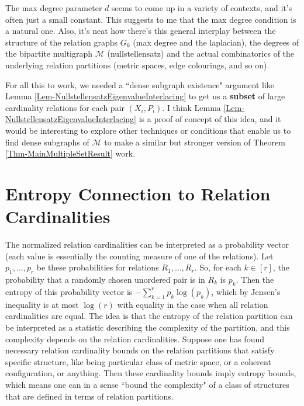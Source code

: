 \documentclass[12pt]{article}
\theoremstyle{definition}
\begin{document}
	The max degree parameter $d$ seems to come up in a variety of contexts, and it's often just a small constant.  This suggests to me that the max degree condition is a natural one.  Also, it's neat how there's this general interplay between the structure of the relation graphs $G_k$ (max degree and the laplacian), the degrees of the bipartite multigraph $\mathcal{M}$ (nullstellensatz) and the actual combinatorics of the underlying relation partitions (metric spaces, edge colourings, and so on).
	
	For all this to work, we needed a ``dense subgraph existence" argument like Lemma \ref{Lem-NullstellensatzEigenvalueInterlacing} to get us a \textbf{subset} of large cardinality relations for each pair $(X_i,P_i)$.  I think Lemma \ref{Lem-NullstellensatzEigenvalueInterlacing} is a proof of concept of this idea, and it would be interesting to explore other techniques or conditions that enable us to find dense subgraphs of $\mathcal{M}$ to make a similar but stronger version of Theorem \ref{Thm-MainMultipleSetResult} work.
	
	\section{Entropy Connection to Relation Cardinalities}
	
	The normalized relation cardinalities can be interpreted as a probability vector (each value is essentially the counting measure of one of the relations).  Let $p_1, \ldots, p_r$ be these probabilities for relations $R_1,\ldots,R_r$.  So, for each $k \in [r]$, the probability that a randomly chosen unordered pair is in $R_k$ is $p_k$.  Then the entropy of this probability vector is $-\sum_{k=1}^r p_k\log(p_k)$, which by Jensen's inequality is at most $\log(r)$ with equality in the case when all relation cardinalities are equal.  The idea is that the entropy of the relation partition can be interpreted as a statistic describing the complexity of the partition, and this complexity depends on the relation cardinalities.  Suppose one has found necessary relation cardinality bounds on the relation partitions that satisfy specific structure, like being particular class of metric space, or a coherent configuration, or anything.  Then these cardinality bounds imply entropy bounds, which means one can in a sense ``bound the complexity" of a class of structures that are defined in terms of relation partitions.  
	
\end{document}
